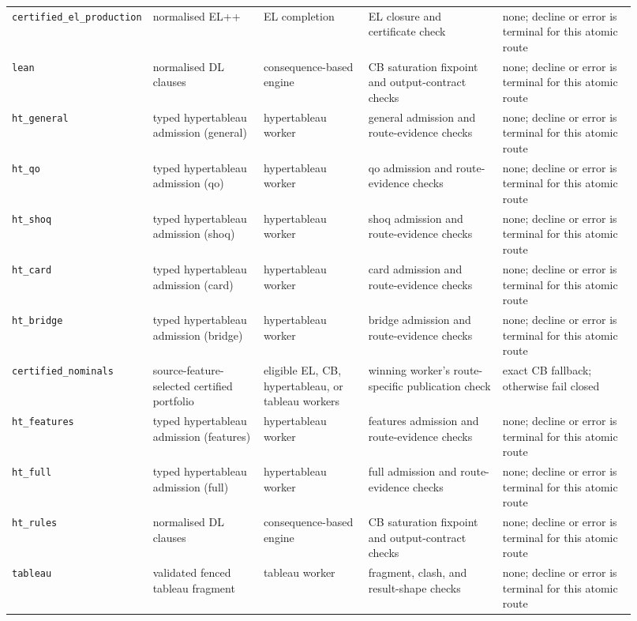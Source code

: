 \begin{longtable}{@{}p{0.13\linewidth}p{0.18\linewidth}p{0.17\linewidth}p{0.22\linewidth}p{0.22\linewidth}@{}}
\texttt{certified\_el\_production} & normalised EL++ & EL completion & EL closure and certificate check & none; decline or error is terminal for this atomic route \\
\texttt{lean} & normalised DL clauses & consequence-based engine & CB saturation fixpoint and output-contract checks & none; decline or error is terminal for this atomic route \\
\texttt{ht\_general} & typed hypertableau admission (general) & hypertableau worker & general admission and route-evidence checks & none; decline or error is terminal for this atomic route \\
\texttt{ht\_qo} & typed hypertableau admission (qo) & hypertableau worker & qo admission and route-evidence checks & none; decline or error is terminal for this atomic route \\
\texttt{ht\_shoq} & typed hypertableau admission (shoq) & hypertableau worker & shoq admission and route-evidence checks & none; decline or error is terminal for this atomic route \\
\texttt{ht\_card} & typed hypertableau admission (card) & hypertableau worker & card admission and route-evidence checks & none; decline or error is terminal for this atomic route \\
\texttt{ht\_bridge} & typed hypertableau admission (bridge) & hypertableau worker & bridge admission and route-evidence checks & none; decline or error is terminal for this atomic route \\
\texttt{certified\_nominals} & source-feature-selected certified portfolio & eligible EL, CB, hypertableau, or tableau workers & winning worker's route-specific publication check & exact CB fallback; otherwise fail closed \\
\texttt{ht\_features} & typed hypertableau admission (features) & hypertableau worker & features admission and route-evidence checks & none; decline or error is terminal for this atomic route \\
\texttt{ht\_full} & typed hypertableau admission (full) & hypertableau worker & full admission and route-evidence checks & none; decline or error is terminal for this atomic route \\
\texttt{ht\_rules} & normalised DL clauses & consequence-based engine & CB saturation fixpoint and output-contract checks & none; decline or error is terminal for this atomic route \\
\texttt{tableau} & validated fenced tableau fragment & tableau worker & fragment, clash, and result-shape checks & none; decline or error is terminal for this atomic route \\

\end{longtable}
